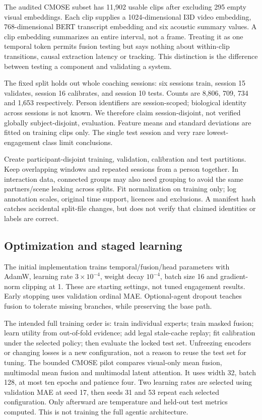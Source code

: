 \documentclass[10pt,a4paper]{article}
\begin{document}
The audited CMOSE subset has 11,902 usable clips after excluding 295 empty visual embeddings. Each clip supplies a 1024-dimensional I3D video embedding, 768-dimensional BERT transcript embedding and six acoustic summary values. A clip embedding summarizes an entire interval, not a frame. Treating it as one temporal token permits fusion testing but says nothing about within-clip transitions, causal extraction latency or tracking. This distinction is the difference between testing a component and validating a system.

The fixed split holds out whole coaching sessions: six sessions train, session 15 validates, session 16 calibrates, and session 10 tests. Counts are 8,806, 709, 734 and 1,653 respectively. Person identifiers are session-scoped; biological identity across sessions is not known. We therefore claim session-disjoint, not verified globally subject-disjoint, evaluation. Feature means and standard deviations are fitted on training clips only. The single test session and very rare lowest-engagement class limit conclusions.

Create participant-disjoint training, validation, calibration and test partitions. Keep overlapping windows and repeated sessions from a person together. In interaction data, connected groups may also need grouping to avoid the same partners/scene leaking across splits. Fit normalization on training only; log annotation scales, original time support, licences and exclusions. A manifest hash catches accidental split-file changes, but does not verify that claimed identities or labels are correct.

\subsection{Optimization and staged learning}
The initial implementation trains temporal/fusion/head parameters with AdamW, learning rate $3\times10^{-4}$, weight decay $10^{-4}$, batch size 16 and gradient-norm clipping at 1. These are starting settings, not tuned engagement results. Early stopping uses validation ordinal MAE. Optional-agent dropout teaches fusion to tolerate missing branches, while preserving the base path.

The intended full training order is: train individual experts; train masked fusion; learn utility from out-of-fold evidence; add legal stale-cache replay; fit calibration under the selected policy; then evaluate the locked test set. Unfreezing encoders or changing losses is a new configuration, not a reason to reuse the test set for tuning. The bounded CMOSE pilot compares visual-only mean fusion, multimodal mean fusion and multimodal latent attention. It uses width 32, batch 128, at most ten epochs and patience four. Two learning rates are selected using validation MAE at seed 17, then seeds 31 and 53 repeat each selected configuration. Only afterward are temperature and held-out test metrics computed. This is not training the full agentic architecture.
\end{document}
